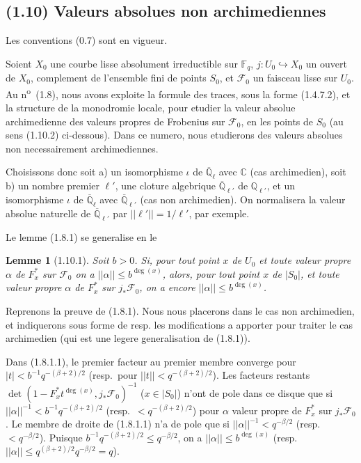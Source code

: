 \documentclass[12pt,a4paper]{article}
\theoremstyle{plain}
\newtheorem{lemme}[theorem]{Lemme}
\theoremstyle{definition}
\theoremstyle{definition}
\theoremstyle{remark}
\begin{document}
\newpage

\subsection*{(1.10) Valeurs absolues non archimediennes}

Les conventions (0.7) sont en vigueur.

Soient $X_0$ une courbe lisse absolument irreductible sur $\mathbb{F}_q$, $j: U_0 \hookrightarrow X_0$ un ouvert de $X_0$, complement de l'ensemble fini de points $S_0$, et $\mathscr{F}_0$ un faisceau lisse sur $U_0$. Au n\textsuperscript{o}~(1.8), nous avons exploite la formule des traces, sous la forme (1.4.7.2), et la structure de la monodromie locale, pour etudier la valeur absolue archimedienne des valeurs propres de Frobenius sur $\mathscr{F}_0$, en les points de $S_0$ (au sens (1.10.2) ci-dessous). Dans ce numero, nous etudierons des valeurs absolues non necessairement archimediennes.

Choisissons donc soit a) un isomorphisme $\iota$ de $\overline{\mathbb{Q}}_\ell$ avec $\mathbb{C}$ (cas archimedien), soit b) un nombre premier $\ell'$, une cloture algebrique $\overline{\mathbb{Q}}_{\ell'}$ de $\mathbb{Q}_{\ell'}$, et un isomorphisme $\iota$ de $\overline{\mathbb{Q}}_\ell$ avec $\overline{\mathbb{Q}}_{\ell'}$ (cas non archimedien). On normalisera la valeur absolue naturelle de $\overline{\mathbb{Q}}_{\ell'}$ par $||\ell'|| = 1/\ell'$, par exemple.

Le lemme (1.8.1) se generalise en le

\begin{lemme}[1.10.1]
Soit $b > 0$. Si, pour tout point $x$ de $U_0$ et toute valeur propre $\alpha$ de $F_x^*$ sur $\mathscr{F}_0$ on a $||\alpha|| \leq b^{\deg(x)}$, alors, pour tout point $x$ de $|S_0|$, et toute valeur propre $\alpha$ de $F_x^*$ sur $j_* \mathscr{F}_0$, on a encore $||\alpha|| \leq b^{\deg(x)}$.
\end{lemme}

Reprenons la preuve de (1.8.1). Nous nous placerons dans le cas non archimedien, et indiquerons sous forme de resp. les modifications a apporter pour traiter le cas archimedien (qui est une legere generalisation de (1.8.1)).

Dans (1.8.1.1), le premier facteur au premier membre converge pour $|t| < b^{-1} q^{-(\beta+2)/2}$ (resp.~pour $||t|| < q^{-(\beta+2)/2}$). Les facteurs restants $\det(1 - F_x^* t^{\deg(x)}, j_* \mathscr{F}_0)^{-1}$ ($x \in |S_0|$) n'ont de pole dans ce disque que si $||\alpha||^{-1} < b^{-1} q^{-(\beta+2)/2}$ (resp.~$< q^{-(\beta+2)/2}$) pour $\alpha$ valeur propre de $F_x^*$ sur $j_* \mathscr{F}_0$. Le membre de droite de (1.8.1.1) n'a de pole que si $||\alpha||^{-1} < q^{-\beta/2}$ (resp.~$< q^{-\beta/2}$). Puisque $b^{-1} q^{-(\beta+2)/2} \leq q^{-\beta/2}$, on a $||\alpha|| \leq b^{\deg(x)}$ (resp.~$||\alpha|| \leq q^{(\beta+2)/2} q^{-\beta/2} = q$).
\end{document}
